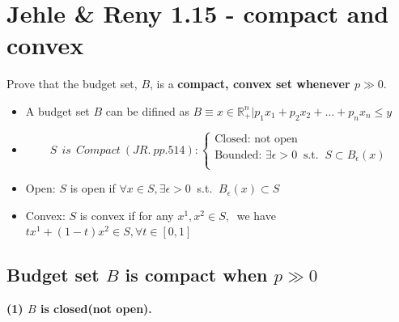 \documentclass{article}
\newcommand{\R}{\mathbb{R}}
\begin{document}
\vspace{2mm}

\section{Jehle \& Reny 1.15 - compact and convex}
Prove that the budget set, $B$, is a \textbf{compact, convex set whenever $p \gg 0$}.

\begin{mdframed}[backgroundcolor=blue!20,linecolor=white]
\begin{itemize}
\item A budget set $B$ can be difined as $B \equiv {x \in \R^n_+ | p_1x_1 + p_2x_2 + \ldots + p_nx_n \le y}$
\item \begin{equation}
 S \  \ is \ \ Compact \ (JR. \ pp. 514):
    \begin{cases}
      \text{Closed: not open}\\
      \text{Bounded: $\exists \epsilon > 0 \ $ s.t. $\ S \subset B_{\epsilon}(x)$}\\
    \end{cases}
    \end{equation}

\item Open:  $S$ is open if $\forall x \in S, \exists \epsilon > 0 \ $ s.t. $\ B_{\epsilon}(x) \subset S$ \\
\item Convex: $S$ is convex if for any $x^1, x^2 \in S,\ $ we have $tx^1 + (1-t)x^2 \in S, \forall t \in [0,1]$
\end{itemize}
\end{mdframed}

\subsection{Budget set $B$ is compact when $p \gg 0$}

\textbf{(1) $B$ is closed(not open).}


{\centering
{}
\label{fig:1_15_close}}
\end{document}
